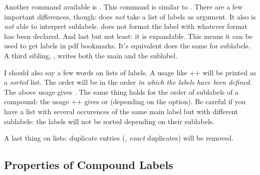 \documentclass[load-preamble+,babel-options={ngerman,british,american}]{cnltx-doc}
\begin{document}
Another command available is .  This command is
similar to .  There are a few important differences, though:
 does \emph{not} take a list of labels as argument.  It also is
\emph{not} able to interpret sublabels.   does not format the
label with whatever format has been declared.  And last but not least: it is
expandable.  This means it can be used to get labels in \ac{pdf} bookmarks.
It's equivalent  does
the same for sublabels.  A third sibling, , writes both the main and the sublabel.

I should also say a few words on lists of labels.  A usage like
\verbcode++ will be printed as a \emph{sorted} list.  The order
will be in the order \emph{in which the labels have been defined}.  The above
usage gives .  The same thing holds for the order of sublabels
of a compound: the usage \verbcode++ gives
 or
 (depending on the
 option).  Be careful if you have a list with several
occurences of the same main label but with different sublabels: the labels
will not be sorted depending on their sublabels.
\begin{example}
   \par
   \par
   \par
\end{example}

A last thing on lists: duplicate entries (\ie, \emph{exact} duplicates) will
be removed.

\subsection{Properties of Compound Labels}\label{sec:prop-comp-labels}
\end{document}
